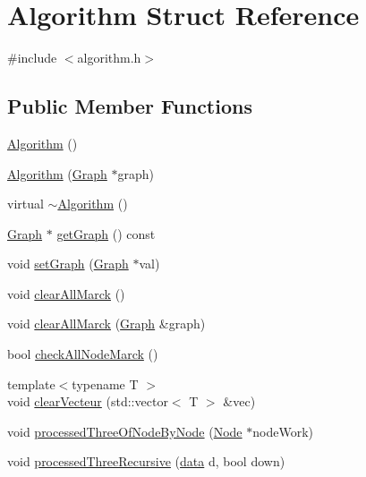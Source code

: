\hypertarget{struct_algorithm}{}\section{Algorithm Struct Reference}
\label{struct_algorithm}


{\ttfamily \#include $<$algorithm.\+h$>$}

\subsection*{Public Member Functions}
\begin{DoxyCompactItemize}
\item 
\mbox{\hyperlink{struct_algorithm_a472bdce2086324f49da7794e27ccaa54}{Algorithm}} ()
\item 
\mbox{\hyperlink{struct_algorithm_a5b56b8a7a5f4ebdd05f9e75862eedd3f}{Algorithm}} (\mbox{\hyperlink{class_graph}{Graph}} $\ast$graph)
\item 
virtual \mbox{\hyperlink{struct_algorithm_ae2801c5b6cd6f45b3852d8c94f354cd5}{$\sim$\+Algorithm}} ()
\item 
\mbox{\hyperlink{class_graph}{Graph}} $\ast$ \mbox{\hyperlink{struct_algorithm_a9589dba6e57847783c9ef56891e0346b}{get\+Graph}} () const
\item 
void \mbox{\hyperlink{struct_algorithm_aa02d10ce76cebfcb8dbca2596181d196}{set\+Graph}} (\mbox{\hyperlink{class_graph}{Graph}} $\ast$val)
\item 
void \mbox{\hyperlink{struct_algorithm_a86fac96d365d99c0a210f060a1daa67c}{clear\+All\+Marck}} ()
\item 
void \mbox{\hyperlink{struct_algorithm_ae9a908eaca25badea660fc00644e66a3}{clear\+All\+Marck}} (\mbox{\hyperlink{class_graph}{Graph}} \&graph)
\item 
bool \mbox{\hyperlink{struct_algorithm_aee02f753076dd71f76d029249c2e1e22}{check\+All\+Node\+Marck}} ()
\item 
{\footnotesize template$<$typename T $>$ }\\void \mbox{\hyperlink{struct_algorithm_a929117c2d005410de6883ad36330328b}{clear\+Vecteur}} (std\+::vector$<$ T $>$ \&vec)
\item 
void \mbox{\hyperlink{struct_algorithm_aa921d8fcc6fa4f434f19c800cda14511}{processed\+Three\+Of\+Node\+By\+Node}} (\mbox{\hyperlink{class_node}{Node}} $\ast$node\+Work)
\item 
void \mbox{\hyperlink{struct_algorithm_a6194b1be053438237fcdbd91fce6e8b0}{processed\+Three\+Recursive}} (\mbox{\hyperlink{_graph_8h_a98cbe1f79429fc62806b32b6e8871d9e}{data}} d, bool down)

\end{DoxyCompactItemize}
